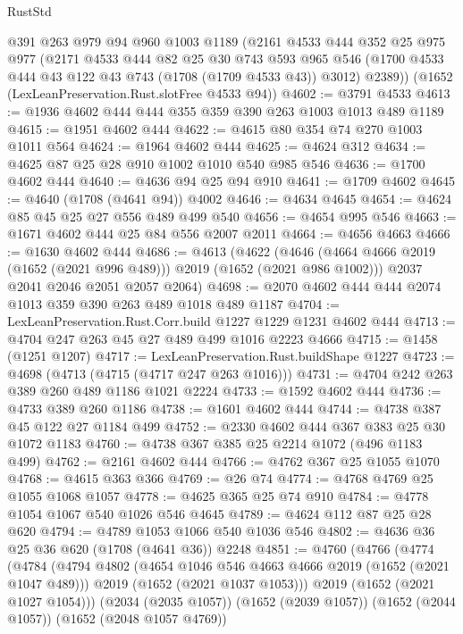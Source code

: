 \begin{lexlean}{RustStd}
\begin{coremodule}
{\begin{coremodule}
{{{{{{{{{{{    @391
    @263
    @979
    @94
    @960
    @1003
    @1189
    (@2161
      @4533
      @444
      @352
      @25
      @975
      @977
      (@2171
        @4533
        @444
        @82
        @25
        @30
        @743
        @593
        @965
        @546
        (@1700 @4533 @444 @43 @122 @43 @743 (@1708 (@1709 @4533 @43)) @3012)
        @2389))
    (@1652 (LexLeanPreservation.Rust.slotFree @4533 @94))
@4602 := @3791 @4533
@4613 := @1936 @4602 @444 @444 @355 @359 @390 @263 @1003 @1013 @489 @1189
@4615 := @1951 @4602 @444
@4622 := @4615 @80 @354 @74 @270 @1003 @1011 @564
@4624 := @1964 @4602 @444
@4625 := @4624 @312
@4634 := @4625 @87 @25 @28 @910 @1002 @1010 @540 @985 @546
@4636 := @1700 @4602 @444
@4640 := @4636 @94 @25 @94 @910
@4641 := @1709 @4602
@4645 := @4640 (@1708 (@4641 @94)) @4002
@4646 := @4634 @4645
@4654 := @4624 @85 @45 @25 @27 @556 @489 @499 @540
@4656 := @4654 @995 @546
@4663 := @1671 @4602 @444 @25 @84 @556 @2007 @2011
@4664 := @4656 @4663
@4666 := @1630 @4602 @444
@4686 := @4613
    (@4622
      (@4646 (@4664 @4666 @2019 (@1652 (@2021 @996 @489))) @2019 (@1652 (@2021 @986 @1002)))
      @2037
      @2041
      @2046
      @2051
      @2057
      @2064)
@4698 := @2070 @4602 @444 @444 @2074 @1013 @359 @390 @263 @489 @1018 @489 @1187
@4704 := LexLeanPreservation.Rust.Corr.build @1227 @1229 @1231 @4602 @444
@4713 := @4704 @247 @263 @45 @27 @489 @499 @1016 @2223 @4666
@4715 := @1458 (@1251 @1207)
@4717 := LexLeanPreservation.Rust.buildShape @1227
@4723 := @4698 (@4713 (@4715 (@4717 @247 @263 @1016)))
@4731 := @4704 @242 @263 @389 @260 @489 @1186 @1021 @2224
@4733 := @1592 @4602 @444
@4736 := @4733 @389 @260 @1186
@4738 := @1601 @4602 @444
@4744 := @4738 @387 @45 @122 @27 @1184 @499
@4752 := @2330 @4602 @444 @367 @383 @25 @30 @1072 @1183
@4760 := @4738 @367 @385 @25 @2214 @1072 (@496 @1183 @499)
@4762 := @2161 @4602 @444
@4766 := @4762 @367 @25 @1055 @1070
@4768 := @4615 @363 @366
@4769 := @26 @74
@4774 := @4768 @4769 @25 @1055 @1068 @1057
@4778 := @4625 @365 @25 @74 @910
@4784 := @4778 @1054 @1067 @540 @1026 @546 @4645
@4789 := @4624 @112 @87 @25 @28 @620
@4794 := @4789 @1053 @1066 @540 @1036 @546
@4802 := @4636 @36 @25 @36 @620 (@1708 (@4641 @36)) @2248
@4851 := @4760
    (@4766
      (@4774
        (@4784
          (@4794
            @4802
            (@4654 @1046 @546 @4663 @4666 @2019 (@1652 (@2021 @1047 @489)))
            @2019
            (@1652 (@2021 @1037 @1053)))
          @2019
          (@1652 (@2021 @1027 @1054)))
        (@2034 (@2035 @1057))
        (@1652 (@2039 @1057))
        (@1652 (@2044 @1057))
        (@1652 (@2048 @1057 @4769))
}}}}}}}}}}}
\end{coremodule}}
\end{coremodule}
\end{lexlean}
